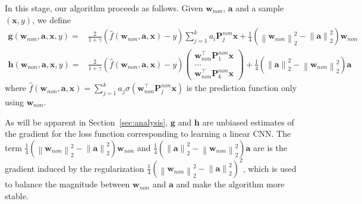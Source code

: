 \documentclass[11pt]{article}
\newcommand{\mat}[1]{\mathbf{#1}}
\newcommand{\vect}[1]{\mathbf{#1}}
\newcommand{\norm}[1]{\left\|#1\right\|}
\newcommand{\relu}[1]{\sigma\left(#1\right)}
\begin{document}
In this stage, our algorithm proceeds as follows.
Given $\vect{w}_{non}$, $\vect{a}$ and a sample $\left(\vect{x},y\right)$, we define \begin{align}
\vect{g}\left(\vect{w}_{non},\vect{a},\vect{x},y\right) = &\frac{2}{1+\gamma}\left(
	\hat{f}(\vect{w}_{non},\vect{a},\vect{x}) - y
	\right) \sum_{j=1}^{k}a_i\mat{P}_j^{non} \vect{x}+\frac{1}{4}\left(\norm{\vect{w}_{non}}_2^2-\norm{\vect{a}}_2^2\right)\vect{w}_{non} \label{eqn:w_non_update}\\
\vect{h}\left(\vect{w}_{non},\vect{a},\vect{x},y\right) =  &\frac{2}{1+\gamma}\left(
	\hat{f}(\vect{w}_{non},\vect{a},\vect{x}) - y\right) \begin{pmatrix}
		\vect{w}_{non}^\top\mat{P}_1^{non} \vect{x}\\
		\ldots\\
		\vect{w}_{non}^\top\mat{P}_k^{non} \vect{x}
	\end{pmatrix}+ \frac{1}{4}\left(\norm{\vect{a}}_2^2-\norm{\vect{w}_{non}}_2^2\right)\vect{a} \label{eqn:a_update}
\end{align}
where $\hat{f}\left(\vect{w}_{non},\vect{a},\vect{x}\right) = \sum_{j=1}^{k}a_j\relu{\vect{w}_{non}^\top \mat{P}_j^{non}\vect{x}}$ is the prediction function only using $\vect{w}_{non}$.

As will be apparent in Section~\ref{sec:analysis}, $\vect{g}$ and $\vect{h}$ are unbiased estimates of the gradient for the loss function corresponding to learning a linear CNN.
The term $\frac{1}{4}\left(\norm{\vect{w}_{non}}_2^2-\norm{\vect{a}}_2^2\right)\vect{w}_{non}$  and $\frac{1}{4}\left(\norm{\vect{a}}_2^2-\norm{\vect{w}_{non}}_2^2\right)\vect{a}$ are is the gradient induced by the regularization  $\frac{1}{4}\left(\norm{\vect{w}_{non}}_2^2-\norm{\vect{a}}_2^2\right)^2$, which is used to balance the magnitude between $\vect{w}_{non}$ and $\vect{a}$ and make the algorithm more stable.  
\end{document}
